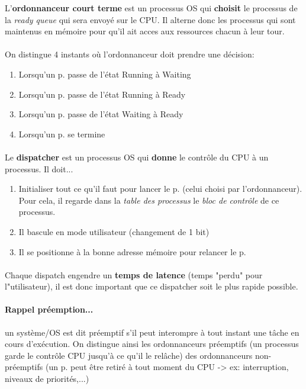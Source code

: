 \item{}
{
L'\textbf{ordonnanceur court terme} est un processus OS qui \textbf{choisit} le processus de la \textit{ready queue} qui sera envoyé sur le CPU. Il alterne donc les processus qui sont maintenus en mémoire pour qu'il ait acces aux ressources chacun à leur tour.
\paragraph{}
On distingue 4 instants où l'ordonnanceur doit prendre une décision:
\begin{enumerate}
\item Lorsqu'un p. passe de l'état Running à Waiting
\item Lorsqu'un p. passe de l'état Running à Ready
\item Lorsqu'un p. passe de l'état Waiting à Ready
\item Lorsqu'un p. se termine
\end{enumerate}

\paragraph{}
Le \textbf{dispatcher} est un processus OS qui \textbf{donne} le contrôle du CPU à un processus. Il doit...
\begin{enumerate}
\item Initialiser tout ce qu'il faut pour lancer le p. (celui choisi par l'ordonnanceur). Pour cela, il regarde dans la \textit{table des processus} le \textit{bloc de contrôle} de ce processus.
\item Il bascule en mode utilisateur (changement de 1 bit)
\item Il se positionne à la bonne adresse mémoire pour relancer le p.
\end{enumerate}

\paragraph{}Chaque dispatch engendre un \textbf{temps de latence} (temps "perdu" pour l"utilisateur), il est donc important que ce dispatcher soit le plus rapide possible.

\paragraph{Rappel préemption...} un système/OS est dit préemptif s'il peut interompre à tout instant une tâche en cours d'exécution. On distingue ainsi les ordonnanceurs préemptifs (un processus garde le contrôle CPU jusqu'à ce qu'il le relâche) des ordonnanceurs non-préemptifs (un p. peut être retiré à tout moment du CPU -> ex: interruption, niveaux de priorités,...)
}
